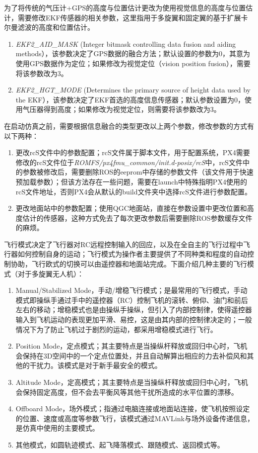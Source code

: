 为了将传统的气压计+GPS的高度与位置估计更改为使用视觉信息的高度与位置估计，需要修改EKF传感器的相关参数，这里指用于多旋翼和固定翼的基于扩展卡尔曼滤波的高度和位置估计。

\begin{enumerate}
	\item 
	\textit{EKF2\_AID\_MASK} (Integer bitmask controlling data fusion and aiding methods），该参数决定了GPS数据的融合方法；默认设置的参数为0，其意为使用GPS数据作为定位；如果修改为视觉定位（vision position fusion），需要将该参数改为3。
	\item 
	\textit{EKF2\_HGT\_MODE} (Determines the primary source of height data used by the EKF），该参数决定了EKF首选的高度信息传感器；默认参数设置为0，使用气压器得到高度；如果修改为视觉定位，则需要将该参数改为3。
\end{enumerate}

在启动仿真之前，需要根据信息融合的类型更改以上两个参数，修改参数的方式有以下两种：
\begin{enumerate}
	\item 更改rcS文件中的参数配置；rcS文件属于脚本文件，用于配置系统，PX4需要修改的rcS文件位于\textit{ROMFS/px4fmu\_common/init.d-posix/rcS}中，rcS文件中的参数被修改后，需要删除ROS的eeprom中存储的参数文件（该文件用于快速预加载参数）；但该方法存在一些问题，需要在launch中特殊指明PX4使用的rcS文件地址，否则PX4会从默认的build文件夹中选择rcS文件进行参数配置。
	\item 
	更改地面站中的参数配置；使用QGC地面站，直接在参数设置中更改位置和高度估计的传感器，这种方式免去了每次更改参数后需要删除ROS参数缓存文件的麻烦。
\end{enumerate}

飞行模式决定了飞行器对RC远程控制输入的回应，以及在全自主的飞行过程中飞行器如何控制自身的运动；飞行模式为操作者主要提供了不同种类和程度的自动控制协助，飞行欧式的切换可以由遥控器和地面站完成。下面介绍几种主要的飞行模式（对于多旋翼无人机）：
\begin{enumerate}
	\item 
	Manual/Stabilized Mode，手动/增稳飞行模式；是最常用的飞行模式，手动模式即操纵手通过手中的遥控器（RC）控制飞机的滚转、俯仰、油门和前后左右的移动；增稳模式也是由操纵手操纵，但引入了内部控制律，使得遥控器输入到飞机运动的表现更加平滑、易控，这是由其内部的控制律决定的；一般情况下为了防止飞机过于剧烈的运动，都采用增稳模式进行飞行。
	\item 
	Position Mode，定点模式；其主要特点是当操纵杆释放或回归中心时，飞机会保持在3D空间中的一个定点位置处，并且自动解算出相应的力去补偿风和其他的干扰力。该模式是对于新手最安全的模式。
	\item
	Altitude Mode，定高模式；其主要特点是当操纵杆释放或回归中心时，飞机会保持固定高度，但不会去平衡风等其他干扰所造成的水平位置的漂移。
	\item 
	Offboard Mode，场外模式；指通过电脑连接或地面站连接，使飞机按照设定的位置、速度或高度等参数飞行，该模式通过MAVLink与场外设备传递信息，是仿真中使用的主要模式。
	\item 
	其他模式，如圆轨迹模式、起飞降落模式、跟随模式、返回模式等。
\end{enumerate}

